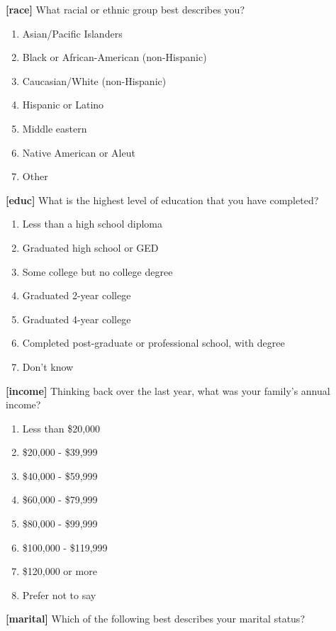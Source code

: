 \documentclass[]{article}
\providecommand{\tightlist}{%
  \setlength{\itemsep}{0pt}\setlength{\parskip}{0pt}}
\begin{document}
\textbf{{[}race{]}} What racial or ethnic group best describes you?

\begin{enumerate}
\def\labelenumi{\arabic{enumi}.}
\tightlist
\item
  Asian/Pacific Islanders
\item
  Black or African-American (non-Hispanic)
\item
  Caucasian/White (non-Hispanic)
\item
  Hispanic or Latino
\item
  Middle eastern
\item
  Native American or Aleut
\item
  Other
\end{enumerate}

\textbf{{[}educ{]}} What is the highest level of education that you have
completed?

\begin{enumerate}
\def\labelenumi{\arabic{enumi}.}
\tightlist
\item
  Less than a high school diploma
\item
  Graduated high school or GED
\item
  Some college but no college degree
\item
  Graduated 2-year college
\item
  Graduated 4-year college
\item
  Completed post-graduate or professional school, with degree
\item
  Don't know
\end{enumerate}

\textbf{{[}income{]}} Thinking back over the last year, what was your
family's annual income?

\begin{enumerate}
\def\labelenumi{\arabic{enumi}.}
\tightlist
\item
  Less than \$20,000
\item
  \$20,000 - \$39,999
\item
  \$40,000 - \$59,999
\item
  \$60,000 - \$79,999
\item
  \$80,000 - \$99,999
\item
  \$100,000 - \$119,999
\item
  \$120,000 or more
\item
  Prefer not to say
\end{enumerate}

\textbf{{[}marital{]}} Which of the following best describes your
marital status?
\end{document}
